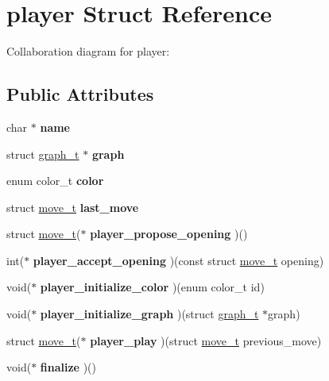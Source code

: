\hypertarget{structplayer}{}\section{player Struct Reference}
\label{structplayer}


Collaboration diagram for player\+:
\subsection*{Public Attributes}
\begin{DoxyCompactItemize}
\item 
\mbox{\label{structplayer_ae2dc38d10930e2bec189dbaef5c6c3c9}} 
char $\ast$ {\bfseries name}
\item 
\mbox{\label{structplayer_afa1a09812c2cb7a7f56b6a9381d829e7}} 
struct \hyperlink{structgraph__t}{graph\+\_\+t} $\ast$ {\bfseries graph}
\item 
\mbox{\label{structplayer_a47aa96599d57e4c4a7e808a54f7ade1a}} 
enum color\+\_\+t {\bfseries color}
\item 
\mbox{\label{structplayer_aa92a572e56b6e53403bb3aae70693128}} 
struct \hyperlink{structmove__t}{move\+\_\+t} {\bfseries last\+\_\+move}
\item 
\mbox{\label{structplayer_aa52e39f37333e1ac38d0c031208f8be1}} 
struct \hyperlink{structmove__t}{move\+\_\+t}($\ast$ {\bfseries player\+\_\+propose\+\_\+opening} )()
\item 
\mbox{\label{structplayer_a3dc15de8f608547cd9a8fa8c9c3d0d97}} 
int($\ast$ {\bfseries player\+\_\+accept\+\_\+opening} )(const struct \hyperlink{structmove__t}{move\+\_\+t} opening)
\item 
\mbox{\label{structplayer_abe4cf498fdab54265c356742ba81f8a2}} 
void($\ast$ {\bfseries player\+\_\+initialize\+\_\+color} )(enum color\+\_\+t id)
\item 
\mbox{\label{structplayer_a0926568b2b839ee554a54a07ee329869}} 
void($\ast$ {\bfseries player\+\_\+initialize\+\_\+graph} )(struct \hyperlink{structgraph__t}{graph\+\_\+t} $\ast$graph)
\item 
\mbox{\label{structplayer_a3e45871933c1a2e1ba57ae89bf11d29b}} 
struct \hyperlink{structmove__t}{move\+\_\+t}($\ast$ {\bfseries player\+\_\+play} )(struct \hyperlink{structmove__t}{move\+\_\+t} previous\+\_\+move)
\item 
\mbox{\label{structplayer_a1caba8d033052626735389e9a3ebac62}} 
void($\ast$ {\bfseries finalize} )()
\end{DoxyCompactItemize}


